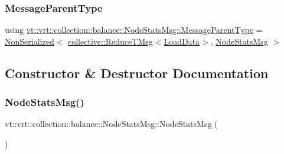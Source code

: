 \subsubsection{\texorpdfstring{Message\+Parent\+Type}{MessageParentType}}
{\footnotesize\ttfamily using \hyperlink{structvt_1_1vrt_1_1collection_1_1balance_1_1_node_stats_msg_a43e175250ef898f201a7c19e5204ba93}{vt\+::vrt\+::collection\+::balance\+::\+Node\+Stats\+Msg\+::\+Message\+Parent\+Type} =  \hyperlink{namespacevt_a378e4a02213923b4ba1c3f9d2a1424c7}{Non\+Serialized}$<$ \hyperlink{namespacevt_1_1collective_a28b82d5d48c9bc6e4fd738fcbf9e0f62}{collective\+::\+Reduce\+T\+Msg}$<$\hyperlink{structvt_1_1vrt_1_1collection_1_1balance_1_1_load_data}{Load\+Data}$>$, \hyperlink{structvt_1_1vrt_1_1collection_1_1balance_1_1_node_stats_msg}{Node\+Stats\+Msg} $>$}



\subsection{Constructor \& Destructor Documentation}
\mbox{\label{structvt_1_1vrt_1_1collection_1_1balance_1_1_node_stats_msg_a4d1c09dda8b28b2ca0b96ed19ab6ee1c}} 
\subsubsection{\texorpdfstring{Node\+Stats\+Msg()}{NodeStatsMsg()}\hspace{0.1cm}{\footnotesize\ttfamily [1/3]}}
{\footnotesize\ttfamily vt\+::vrt\+::collection\+::balance\+::\+Node\+Stats\+Msg\+::\+Node\+Stats\+Msg (\begin{DoxyParamCaption}{ }\end{DoxyParamCaption})\hspace{0.3cm}{\ttfamily [default]}}

\mbox{\label{structvt_1_1vrt_1_1collection_1_1balance_1_1_node_stats_msg_a47bbd1a5126c30f3873824f2698b8413}} 
